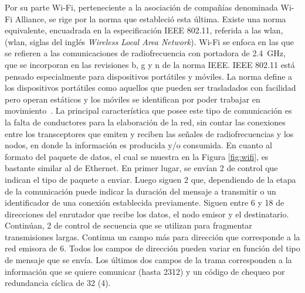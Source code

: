 Por su parte Wi-Fi, perteneciente a la asociación de compañías denominada Wi-Fi Alliance, se rige por la norma que estableció esta última. Existe una norma equivalente, encuadrada en la especificación IEEE 802.11, referida a las \acrlong{wlan}, (\acrshort{wlan}, siglas del inglés {\it Wireless Local Area Network}). Wi-Fi se enfoca en las que se refieren a las comunicaciones de radiofrecuencia con portadora de \SI{2,4}{\giga\hertz}, que se incorporan en las revisiones b, g y n de la norma IEEE. IEEE 802.11 está pensado especialmente para dispositivos portátiles y móviles. La norma define a los dispositivos portátiles como aquellos que pueden ser trasladados con facilidad pero operan estáticos y los móviles se identifican por poder trabajar en movimiento~\cite{wifi2016}. La principal característica que posee este tipo de comunicación es la falta de conductores para la elaboración de la red, sin contar las conexiones entre los transceptores que emiten y reciben las señales de radiofrecuencias y los nodos, en donde la información es producida y/o consumida. En cuanto al formato del paquete de datos, el cual se muestra en la Figura \ref{fig:wifi}, es bastante similar al de Ethernet. En primer lugar, se envían \SI{2}{\byte} de control que indican el tipo de paquete a enviar. Luego siguen \SI{2}{\byte} que, dependiendo de la etapa de la comunicación puede indicar la duración del mensaje a transmitir o un identificador de una conexión establecida previamente. Siguen entre \si{6} y \SI{18}{\byte} de direcciones del enrutador que recibe los datos, el nodo emisor y el destinatario. Continúan, \SI{2}{\byte} de control de secuencia que se utilizan para fragmentar transmisiones largas. Continua un campo más para dirección que corresponde a la red emisora de \SI{6}{\byte}. Todos los campos de dirección pueden variar en función del tipo de mensaje que se envía. Los últimos dos campos de la trama corresponden a la información que se quiere comunicar (hasta \SI{2312}{\byte}) y un código de chequeo por redundancia cíclica de \SI{32}{\bit} (\SI{4}{\byte}).%

